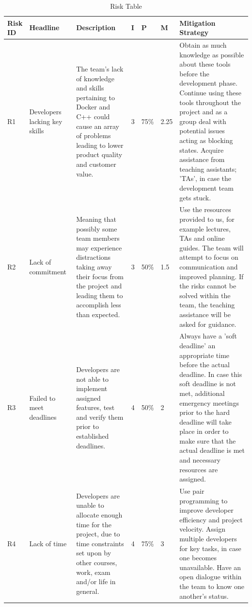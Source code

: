 \documentclass[12pt]{article}
\begin{document}
\begin{longtable}{| p{0.06\linewidth} | p{0.20\linewidth} | p{0.25\linewidth} | p{0.04\linewidth} | p{0.05\linewidth} | p{0.05\linewidth} | p{0.35\linewidth}|}
\caption{Risk Table}
\label{Risk Table}
\endfirsthead
\endhead
\hline

\textbf{Risk ID} & 
\textbf{Headline} & 
\textbf{Description} & 
\textbf{I} & 
\textbf{P} & 
\textbf{M} & 
\textbf{Mitigation Strategy}
\\ \hline

   	R1 & 
Developers lacking key skills & 
The team’s lack of knowledge and skills pertaining to Docker and C++ could cause an array of problems leading to lower product quality and customer value. & 
3 & 
75\% & 
2.25 &
Obtain as much knowledge as possible about these tools before the development phase. Continue using these tools throughout the project and as a group deal with potential issues acting as blocking states. Acquire assistance from teaching assistants; 'TAs', in case the development team gets stuck. \\ \hline
 
    	R2 & 
Lack of commitment & 
Meaning that possibly some team members may experience distractions taking away their focus from the project and leading them to accomplish less than expected. & 
3 & 
50\% & 
1.5 &
Use the resources provided to us, for example lectures, TAs and online guides. The team will attempt to focus on communication and improved planning. If the risks cannot be solved within the team, the teaching assistance will be asked for guidance. \\ \hline
   	
	R3 & 
Failed to meet deadlines &
Developers are not able to implement assigned features, test and verify them prior to established deadlines. &
4 & 
50\% & 
2 &
Always have a 'soft deadline' an appropriate time before the actual deadline. In case this soft deadline is not met, additional emergency meetings prior to the hard deadline will take place in order to make sure that the actual deadline is met and necessary resources are assigned. \\ \hline

	R4 & 
Lack of time &
Developers are unable to allocate enough time for the project, due to time constraints set upon by other courses, work, exam and/or life in general. &
4 & 
75\% & 
3 &
Use pair programming to improve developer efficiency and project velocity. Assign multiple developers for key tasks, in case one becomes unavailable. Have an open dialogue within the team to know one another's status. \\ \hline


\end{longtable}
\end{document}
